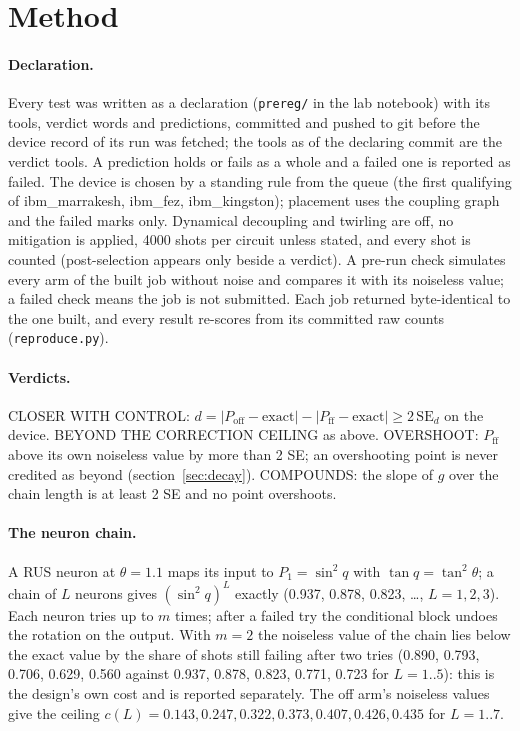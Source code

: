 \documentclass[10pt,a4paper]{article}
\begin{document}
\section{Method}\label{sec:method}
\paragraph{Declaration.} Every test was written as a declaration (\texttt{prereg/} in the lab notebook) with its tools,
verdict words and predictions, committed and pushed to git before the device record of its run was fetched; the tools
as of the declaring commit are the verdict tools. A prediction holds or fails as a whole and a failed one is reported
as failed. The device is chosen by a standing rule from the queue (the first qualifying of ibm\_marrakesh, ibm\_fez,
ibm\_kingston); placement uses the coupling graph and the failed marks only. Dynamical decoupling and twirling are off,
no mitigation is applied, 4000 shots per circuit unless stated, and every shot is counted (post-selection appears only
beside a verdict). A pre-run check simulates every arm of the built job without noise and compares it with its
noiseless value; a failed check means the job is not submitted. Each job returned byte-identical to the one built, and
every result re-scores from its committed raw counts (\texttt{reproduce.py}).

\paragraph{Verdicts.} CLOSER WITH CONTROL: $d = |P_\mathrm{off} - \text{exact}| - |P_\mathrm{ff} - \text{exact}|
\ge 2\,\mathrm{SE}_d$ on the device. BEYOND THE CORRECTION CEILING as above. OVERSHOOT: $P_\mathrm{ff}$ above its own
noiseless value by more than 2 SE; an overshooting point is never credited as beyond (section~\ref{sec:decay}).
COMPOUNDS: the slope of $g$ over the chain length is at least 2 SE and no point overshoots.

\paragraph{The neuron chain.} A RUS neuron at $\theta = 1.1$ maps its input to $P_1 = \sin^2 q$ with $\tan q = \tan^2
\theta$; a chain of $L$ neurons gives $(\sin^2 q)^L$ exactly (0.937, 0.878, 0.823, \dots, $L = 1, 2, 3$). Each neuron
tries up to $m$ times; after a failed try the conditional block undoes the rotation on the output. With $m = 2$ the
noiseless value of the chain lies below the exact value by the share of shots still failing after two tries (0.890,
0.793, 0.706, 0.629, 0.560 against 0.937, 0.878, 0.823, 0.771, 0.723 for $L = 1..5$): this is the design's own cost and
is reported separately. The off arm's noiseless values give the ceiling $c(L) = 0.143, 0.247, 0.322, 0.373, 0.407,
0.426, 0.435$ for $L = 1..7$.
\end{document}
